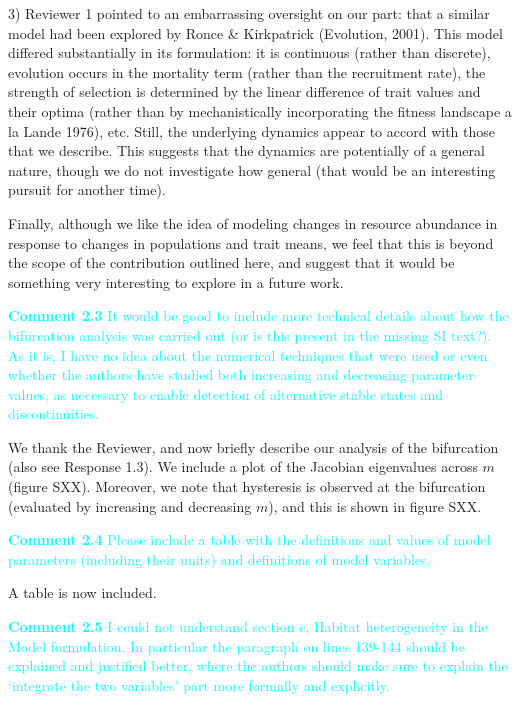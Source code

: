\documentclass[ucm,12pt]{ucletter}
\newcounter{section}
\begin{document}
\begin{letter}
3) Reviewer 1 pointed to an embarrassing oversight on our part: that a similar model had been explored by Ronce \& Kirkpatrick (Evolution, 2001). This model differed substantially in its formulation: it is continuous (rather than discrete), evolution occurs in the mortality term (rather than the recruitment rate), the strength of selection is determined by the linear difference of trait values and their optima (rather than by mechanistically incorporating the fitness landscape a la Lande 1976), etc. Still, the underlying dynamics appear to accord with those that we describe. This suggests that the dynamics are potentially of a general nature, though we do not investigate how general (that would be an interesting pursuit for another time).

Finally, although we like the idea of modeling changes in resource abundance in response to changes in populations and trait means, we feel that this is beyond the scope of the contribution outlined here, and suggest that it would be something very interesting to explore in a future work.


\noindent \textcolor{cyan}{
{\bf Comment 2.3} It would be good to include more technical details about how the bifurcation analysis was carried out (or is this present in the missing SI text?). As it is, I have no idea about the numerical techniques that were used or even whether the authors have studied both increasing and decreasing parameter values, as necessary to enable detection of alternative stable states and discontinuities.
}

 We thank the Reviewer, and now briefly describe our analysis of the bifurcation (also see Response 1.3). We include a plot of the Jacobian eigenvalues across $m$ (figure SXX). Moreover, we note that hysteresis is observed at the bifurcation (evaluated by increasing and decreasing $m$), and this is shown in figure SXX.

\noindent \textcolor{cyan}{
{\bf Comment 2.4} Please include a table with the definitions and values of model parameters (including their units) and definitions of model variables.
}

 A table is now included. 

\noindent \textcolor{cyan}{
{\bf Comment 2.5} I could not understand section c, Habitat heterogeneity in the Model formulation. In particular the paragraph on lines 139-144 should be explained and justified better, where the authors should make sure to explain the ‘integrate the two variables’ part more formally and explicitly.
}


\end{letter}
\end{document}
